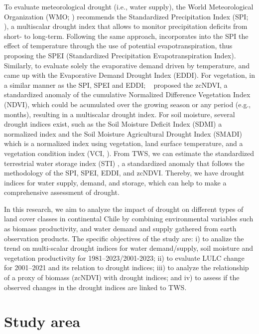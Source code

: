 \documentclass[
  number,
  preprint,
  3p]{elsarticle}
\begin{document}
To evaluate meteorological drought (i.e., water supply), the World
Meteorological Organization (WMO; \citep{WMO2012}) recommends the
Standardized Precipitation Index (SPI; \citep{Mckee1993}), a multiscalar
drought index that allows to monitor precipitation deficits from short-
to long-term. Following the same approach, \citep{Vicente-Serrano2010}
incorporates into the SPI the effect of temperature through the use of
potential evapotranspiration, thus proposing the SPEI (Standardized
Precipitation Evapotranspiration Index). Similarly, to evaluate solely
the evaporative demand driven by temperature, \citep{Hobbins2016} and
\citep{McEvoy2016} came up with the Evaporative Demand Drought Index
(EDDI). For vegetation, in a similar manner as the SPI, SPEI and EDDI;
~\citep{Zambrano2018} proposed the zcNDVI, a standardized anomaly of the
cumulative Normalized Difference Vegetation Index (NDVI), which could be
acumulated over the growing season or any period (e.g., months),
resulting in a multiscalar drought index. For soil moisture, several
drought indices exist, such as the Soil Moisture Deficit Index (SDMI) a
normalized index \citep{Narasimhan2005} and the Soil Moisture
Agricultural Drought Index (SMADI) \citep{Souza2021} which is a
normalized index using vegetation, land surface temperature, and a
vegetation condition index (VCI, \citep{Kogan1995}). From TWS, we can
estimate the standardized terrestrial water storage index (STI)
\citep{Cui2021}, a standardized anomaly that follows the methodology of
the SPI, SPEI, EDDI, and zcNDVI. Thereby, we have drought indices for
water supply, demand, and storage, which can help to make a
comprehensive assessment of drought.

In this research, we aim to analyze the impact of drought on different
types of land cover classes in continental Chile by combining
environmental variables such as biomass productivity, and water demand
and supply gathered from earth observation products. The specific
objectives of the study are: i) to analize the trend on multi-scalar
drought indices for water demand/supply, soil moisture and vegetation
productivity for 1981--2023/2001-2023; ii) to evaluate LULC change for
2001--2021 and its relation to drought indices; iii) to analyze the
relationship of a proxy of biomass (zcNDVI) with drought indices; and
iv) to assess if the observed changes in the drought indices are linked
to TWS.

\hypertarget{study-area}{%
\section{Study area}\label{study-area}}
\end{document}
